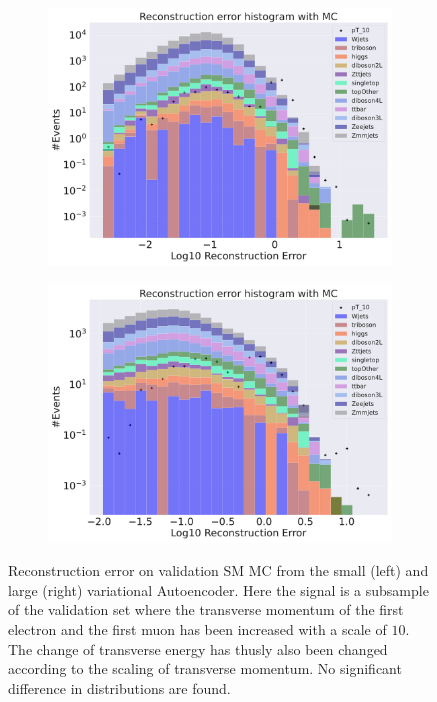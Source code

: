 \begin{figure}[h!]
    \centering
    \begin{subfigure}{.45\textwidth}
        \includegraphics[width=\textwidth]{Figures/VAE_testing/small/b_data_recon_big_rm3_feats_sig_pT_10.pdf}
        \caption{ }
        \label{fig:VAE_small_pt_10}
    \end{subfigure}
    \hfill 
    \begin{subfigure}{.45\textwidth}
        \includegraphics[width=\textwidth]{Figures/VAE_testing/big/b_data_recon_big_rm3_feats_sig_pT_10.pdf}
        \caption{}
        \label{fig:VAE_big_pt_10}
    \end{subfigure}
    \hfill 
    \caption[VAE | Reconstruction error $p_T$ altering of 10]{Reconstruction error on validation SM MC from the small (left) and large (right) variational Autoencoder. Here the signal is a subsample of the validation 
    set where the transverse momentum of the first electron and the first muon has been increased with a scale of $10$. The change of transverse 
    energy has thusly also been changed according to the scaling of transverse momentum. No significant difference in distributions are found. }
    \label{fig:VAE_big_small_pt_10}
\end{figure}

